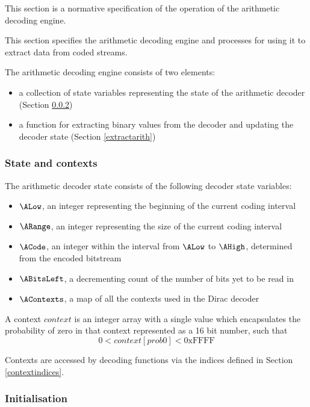 This section is a normative specification of the operation of the arithmetic
decoding engine.

\label{arithdecodingengine}

This section specifies the arithmetic decoding engine and
processes for using it to extract data from coded streams.

The arithmetic decoding engine consists of two elements: 

\begin{itemize}
\item a collection of state variables representing the state of the arithmetic 
decoder (Section \ref{initarith})
\item a function for extracting binary values from the decoder 
and updating the decoder state (Section \ref{extractarith})
\end{itemize}

\subsubsection{State and contexts}
\label{arithcontexts}

The arithmetic decoder state consists of the following decoder state variables:

\begin{itemize}
\item $\ALow$, an integer representing the beginning of the current coding interval
\item $\ARange$, an integer representing the size of the current coding interval
\item $\ACode$, an integer within the interval from $\ALow$ to $\AHigh$, determined from the encoded bitstream
\item $\ABitsLeft$, a decrementing count of the number of bits yet to be read in
\item $\AContexts$, a map of all the contexts used in the Dirac decoder
\end{itemize}

A context $context$ is an integer array with a single value which encapsulates
the probability of zero in that context represented as a 16 bit number, such that
\[0<context[prob0]<\text{0xFFFF}\]

Contexts are accessed by decoding functions via the indices defined in Section \ref{contextindices}. 

\subsubsection{Initialisation}
\label{initarith}

